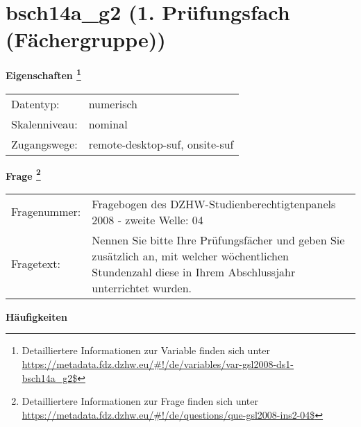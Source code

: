 
    \setcounter{footnote}{0}

    \vspace*{-1.8cm}
	\section{bsch14a\_g2 (1. Prüfungsfach (Fächergruppe))}
	\label{section:bsch14a_g2}



    \vspace*{0.5cm}
    \noindent\textbf{Eigenschaften
	\footnote{Detailliertere Informationen zur Variable finden sich unter
		\url{https://metadata.fdz.dzhw.eu/\#!/de/variables/var-gsl2008-ds1-bsch14a_g2$}}}\\
	\begin{tabularx}{\hsize}{@{}lX}
	Datentyp: & numerisch \\
	Skalenniveau: & nominal \\
	Zugangswege: &
	  remote-desktop-suf, 
	  onsite-suf
 \\
    \end{tabularx}



				\vspace*{0.5cm}
                \noindent\textbf{Frage
	                \footnote{Detailliertere Informationen zur Frage finden sich unter
		              \url{https://metadata.fdz.dzhw.eu/\#!/de/questions/que-gsl2008-ins2-04$}}}\\
				\begin{tabularx}{\hsize}{@{}lX}
					Fragenummer: &
					  Fragebogen des DZHW-Studienberechtigtenpanels 2008 - zweite Welle:
					  04
 \\
					Fragetext: & Nennen Sie bitte Ihre Prüfungsfächer und geben Sie zusätzlich an, mit welcher wöchentlichen Stundenzahl diese in Ihrem Abschlussjahr unterrichtet wurden. \\
				\end{tabularx}





        		\vspace*{0.5cm}
                \noindent\textbf{Häufigkeiten}

